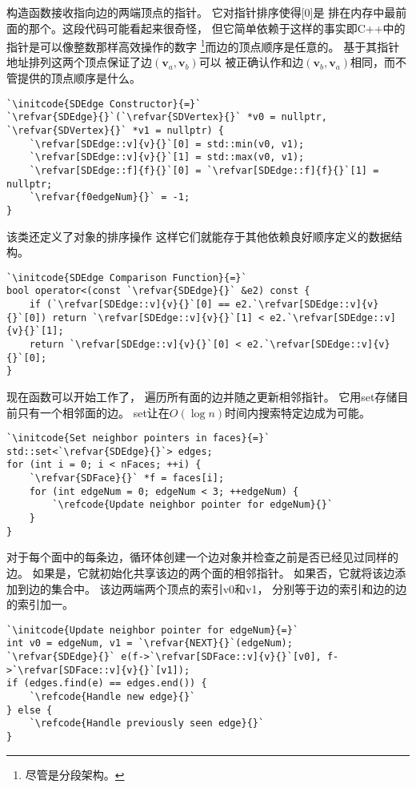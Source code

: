 构造函数接收指向边的两端顶点的指针。
它对指针排序使得{\ttfamily{}[0]}是
排在内存中最前面的那个。这段代码可能看起来很奇怪，
但它简单依赖于这样的事实即C++中的指针是可以像整数那样高效操作的数字
\footnote{尽管是分段架构。}而边的顶点顺序是任意的。
基于其指针地址排列这两个顶点保证了边$(\bm v_a,\bm v_b)$可以
被正确认作和边$(\bm v_b,\bm v_a)$相同，而不管提供的顶点顺序是什么。
\begin{lstlisting}
`\initcode{SDEdge Constructor}{=}`
`\refvar{SDEdge}{}`(`\refvar{SDVertex}{}` *v0 = nullptr, `\refvar{SDVertex}{}` *v1 = nullptr) {
    `\refvar[SDEdge::v]{v}{}`[0] = std::min(v0, v1);
    `\refvar[SDEdge::v]{v}{}`[1] = std::max(v0, v1);
    `\refvar[SDEdge::f]{f}{}`[0] = `\refvar[SDEdge::f]{f}{}`[1] = nullptr;
    `\refvar{f0edgeNum}{}` = -1;
}
\end{lstlisting}

该类还定义了对象的排序操作
这样它们就能存于其他依赖良好顺序定义的数据结构。
\begin{lstlisting}
`\initcode{SDEdge Comparison Function}{=}`
bool operator<(const `\refvar{SDEdge}{}` &e2) const {
    if (`\refvar[SDEdge::v]{v}{}`[0] == e2.`\refvar[SDEdge::v]{v}{}`[0]) return `\refvar[SDEdge::v]{v}{}`[1] < e2.`\refvar[SDEdge::v]{v}{}`[1];
    return `\refvar[SDEdge::v]{v}{}`[0] < e2.`\refvar[SDEdge::v]{v}{}`[0];
}
\end{lstlisting}

现在函数可以开始工作了，
遍历所有面的边并随之更新相邻指针。
它用{\ttfamily set}存储目前只有一个相邻面的边。
{\ttfamily set}让在$O(\log{n})$时间内搜索特定边成为可能。
\begin{lstlisting}
`\initcode{Set neighbor pointers in faces}{=}`
std::set<`\refvar{SDEdge}{}`> edges;
for (int i = 0; i < nFaces; ++i) {
    `\refvar{SDFace}{}` *f = faces[i];
    for (int edgeNum = 0; edgeNum < 3; ++edgeNum) {
        `\refcode{Update neighbor pointer for edgeNum}{}`
    }
}
\end{lstlisting}

对于每个面中的每条边，循环体创建一个边对象并检查之前是否已经见过同样的边。
如果是，它就初始化共享该边的两个面的相邻指针。
如果否，它就将该边添加到边的集合中。
该边两端两个顶点的索引{\ttfamily v0}和{\ttfamily v1}，
分别等于边的索引和边的边的索引加一。
\begin{lstlisting}
`\initcode{Update neighbor pointer for edgeNum}{=}`
int v0 = edgeNum, v1 = `\refvar{NEXT}{}`(edgeNum);
`\refvar{SDEdge}{}` e(f->`\refvar[SDFace::v]{v}{}`[v0], f->`\refvar[SDFace::v]{v}{}`[v1]);
if (edges.find(e) == edges.end()) {
    `\refcode{Handle new edge}{}`
} else {
    `\refcode{Handle previously seen edge}{}`
}
\end{lstlisting}

